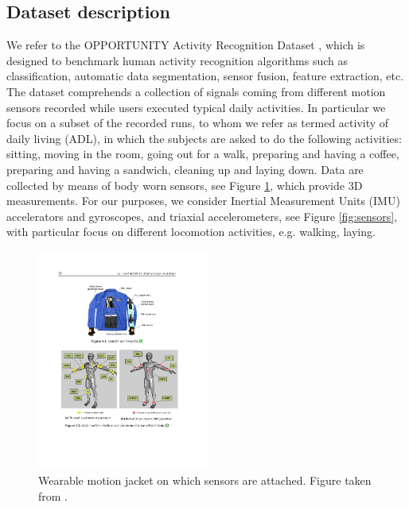 \documentclass[10pt, a4paper, twocolumn]{article}
\theoremstyle{definition}
\begin{document}
\subsection{Dataset description}
We refer to the OPPORTUNITY Activity Recognition Dataset \cite{opportunity}, which is designed to benchmark human activity recognition algorithms such as classification, automatic data segmentation, sensor fusion, feature extraction, etc.
The dataset  comprehends a collection of signals coming from different motion sensors recorded while users executed typical daily activities. In particular we focus on a subset of the recorded runs, to whom we refer as termed activity of daily living (ADL), in which the subjects are asked to do the following activities: sitting, moving in the room, going out for a walk, preparing and having a coffee, preparing and having a sandwich, cleaning up and laying down.
Data are collected by means of body worn sensors, see Figure \ref{fig:jacket}, which provide 3D measurements. For our purposes, we consider Inertial Measurement Units (IMU) accelerators and gyroscopes, and triaxial accelerometers, see Figure \ref{fig:sensors}, with particular focus on different locomotion activities, e.g. walking, laying.
\begin{figure} 
         \includegraphics[width=0.5\textwidth]{images/jacket_wearable.pdf}
    \caption{Wearable motion jacket on which sensors are attached. Figure taken from \cite{opportunity}.}\label{fig:jacket}
\end{figure}
\end{document}
